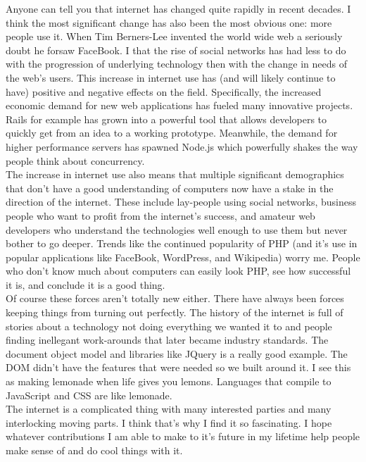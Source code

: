 \documentclass[11pt]{article}
\begin{document}
  
  Anyone can tell you that internet has changed quite rapidly in
  recent decades.  I think the most significant change has also been
  the most obvious one: more people use it.  When Tim Berners-Lee
  invented the world wide web a seriously doubt he forsaw FaceBook.  I
  that the rise of social networks has had less to do with the
  progression of underlying technology then with the change in needs
  of the web's users.  This increase in internet use has (and will
  likely continue to have) positive and negative effects on the
  field.  Specifically, the increased economic demand for new web
  applications has fueled many innovative projects.  Rails for example
  has grown into a powerful tool that allows developers to quickly get
  from an idea to a working prototype.  Meanwhile, the demand for
  higher performance servers has spawned Node.js which powerfully
  shakes the way people think about concurrency. \\
  
  The increase in internet use also means that multiple significant
  demographics that don't have a good understanding of computers now
  have a stake in the direction of the internet.  These include
  lay-people using social networks, business people who want to profit
  from the internet's success, and amateur web developers who
  understand the technologies well enough to use them but never bother
  to go deeper.  Trends like the continued popularity of PHP (and it's
  use in popular applications like FaceBook, WordPress, and Wikipedia)
  worry me.  People who don't know much about computers can easily
  look PHP, see how successful it is, and conclude it is a good
  thing. \\
  
  Of course these forces aren't totally new either.  There have always
  been forces keeping things from turning out perfectly.  The history
  of the internet is full of stories about a technology not doing
  everything we wanted it to and people finding inellegant
  work-arounds that later became industry standards.  The document
  object model and libraries like JQuery is a really good example.
  The DOM didn't have the features that were needed so we built around
  it.  I see this as making lemonade when life gives you lemons.
  Languages that compile to JavaScript and CSS are like lemonade. \\
  
  The internet is a complicated thing with many interested parties and
  many interlocking moving parts.  I think that's why I find it so
  fascinating.  I hope whatever contributions I am able to make to
  it's future in my lifetime help people make sense of and do cool
  things with it.
\end{document}
